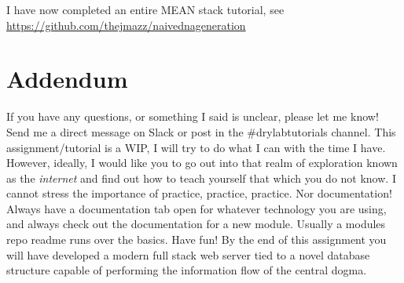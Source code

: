 \mpnote

\noindent I have now completed an entire MEAN stack tutorial, see
\href{https://github.com/thejmazz/naivednageneration}{https://github.com/thejmazz/naivednageneration}

\section{Addendum}

If you have any questions, or something I said is unclear, please let me know!
Send me a direct message on Slack or post in the \#drylabtutorials channel.
This assignment/tutorial is a WIP, I will try to do what I can with the time I 
have. However, ideally, I would like you to go out into that realm of exploration
known as the \textit{internet} and find out how to teach yourself that which
you do not know. I cannot stress the importance of practice, practice, practice.
Nor documentation! Always have a documentation tab open for whatever technology
you are using, and always check out the documentation for a new module. Usually
a modules repo readme runs over the basics. Have fun! By the end of this 
assignment you will have developed a modern full stack web server tied to
a novel database structure capable of performing the information flow of the
central dogma.


